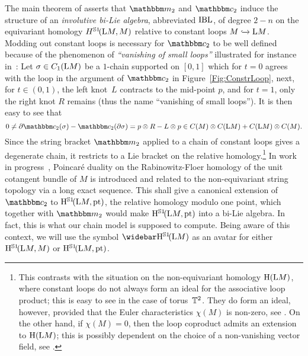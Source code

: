 \documentclass[\MainFolder/Text.tex]{subfiles}
\begin{document}
The main theorem of \cite{Sullivan2002} asserts that $\StringOp_2$ and $\StringCoOp_2$ induce the structure of an \emph{involutive bi-Lie algebra}, abbreviated $\mathrm{IBL}$, of degree $2-n$ on the equivariant homology $H^{\mathbb{S}{1}}\!(\mathrm{L} M,M)$ relative to constant loops $M\xhookrightarrow{}\mathrm{L} M$.
Modding out constant loops is necessary for $\StringCoOp_2$ to be well defined because of the phenomenon of \emph{``vanishing of small loops''} illustrated for instance in~\cite{Cieliebak2007}:  Let $\sigma\in C_1(\mathrm{L} M)$ be a $1$-chain supported on $[0,1]$ which for $t=0$ agrees with the loop in the argument of $\StringCoOp_2$ in Figure~\ref{Fig:ConstrLoop}, next, for $t\in (0,1)$, the left knot~$L$ contracts to the mid-point $p$, and for $t=1$, only the right knot $R$ remains (thus the name ``vanishing of small loops'').
It is then easy to see that 
\[ 0 \neq \Bdd \StringCoOp_2(\sigma) - \StringCoOp_2(\Bdd \sigma) = p\otimes R - L \otimes p \in C(M)\otimes C(\Loop M) + C(\Loop M)\otimes C(M). \]
Since the string bracket $\StringOp_2$ applied to a chain of constant loops gives a degenerate chain, it restricts to a Lie bracket on the relative homology.\footnote{This contrasts with the situation on the non-equivariant homology $\mathrm{H}(\mathrm{L} M)$, where constant loops do not always form an ideal for the associative loop product; this is easy to see in the case of torus~$\mathbb{T}^2$. They do form an ideal, however, provided that the Euler characteristics $\chi(M)$ is non-zero, see \cite{Tamanoi2010}.
On the other hand, if $\chi(M)=0$, then the loop coproduct admits an extension to $\mathrm{H}(\mathrm{L} M)$; this is possibly dependent on the choice of a non-vanishing vector field, see \cite{Basu2011}.}
In work in progress~\cite{CieliebakHingston2018}, Poincar\'e duality on the Rabinowitz-Floer homology of the unit cotangent bundle of $M$ is introduced and related to the non-equivariant string topology via a long exact sequence.
This shall give a canonical extension of $\StringCoOp_2$ to $\mathrm{H}^{\mathbb{S}{1}}\!(\mathrm{L} M,\mathrm{pt})$, the relative homology modulo one point, which together with $\StringOp_2$ would make $\mathrm{H}^{\mathbb{S}{1}}\!(\mathrm{L} M,\mathrm{pt})$ into a bi-Lie algebra.
In fact, this is what our chain model is supposed to compute.
Being aware of this context, we will use the symbol $\RedEquivHom(\Loop M)$ as an avatar for either $\mathrm{H}^{\mathbb{S}{1}}\!(\mathrm{L} M,M)$ or $\mathrm{H}^{\mathbb{S}{1}}\!(\mathrm{L} M,\mathrm{pt})$.
\end{document}
